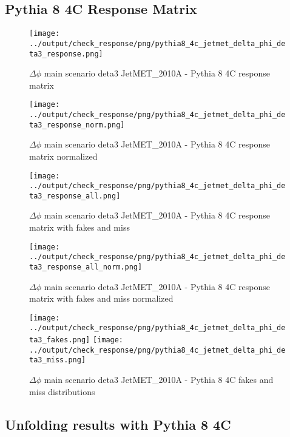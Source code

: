 \documentclass[11pt]{book}
\begin{document}
\clearpage
\subsection{Pythia 8 4C Response Matrix}


\begin{figure}[ht]
\centering
\texttt{[image: ../output/check\_response/png/pythia8\_4c\_jetmet\_delta\_phi\_deta3\_response.png]}
\caption{$\Delta\phi$ main scenario deta3 JetMET\_2010A - Pythia 8 4C response matrix}
\label{p8_jetmet_delta_phi_deta3_response}
\end{figure}

\begin{figure}[ht]
\centering
\texttt{[image: ../output/check\_response/png/pythia8\_4c\_jetmet\_delta\_phi\_deta3\_response\_norm.png]}
\caption{$\Delta\phi$ main scenario deta3 JetMET\_2010A - Pythia 8 4C response matrix normalized}
\label{p8_jetmet_delta_phi_deta3_response_norm}
\end{figure}

\begin{figure}[ht]
\centering
\texttt{[image: ../output/check\_response/png/pythia8\_4c\_jetmet\_delta\_phi\_deta3\_response\_all.png]}
\caption{$\Delta\phi$ main scenario deta3 JetMET\_2010A - Pythia 8 4C response matrix with fakes and miss}
\label{p8_jetmet_delta_phi_deta3_response_all}
\end{figure}

\begin{figure}[ht]
\centering
\texttt{[image: ../output/check\_response/png/pythia8\_4c\_jetmet\_delta\_phi\_deta3\_response\_all\_norm.png]}
\caption{$\Delta\phi$ main scenario deta3 JetMET\_2010A - Pythia 8 4C response matrix with fakes and miss normalized}
\label{p8_jetmet_delta_phi_deta3_response_all_norm}
\end{figure}

\begin{figure}[ht]
\centering
\texttt{[image: ../output/check\_response/png/pythia8\_4c\_jetmet\_delta\_phi\_deta3\_fakes.png]}
\texttt{[image: ../output/check\_response/png/pythia8\_4c\_jetmet\_delta\_phi\_deta3\_miss.png]}
\caption{$\Delta\phi$ main scenario deta3 JetMET\_2010A - Pythia 8 4C fakes and miss distributions}
\label{p8_jetmet_delta_phi_deta3_fakesmiss}
\end{figure}


\clearpage
\subsection{Unfolding results with Pythia 8 4C}
\end{document}
